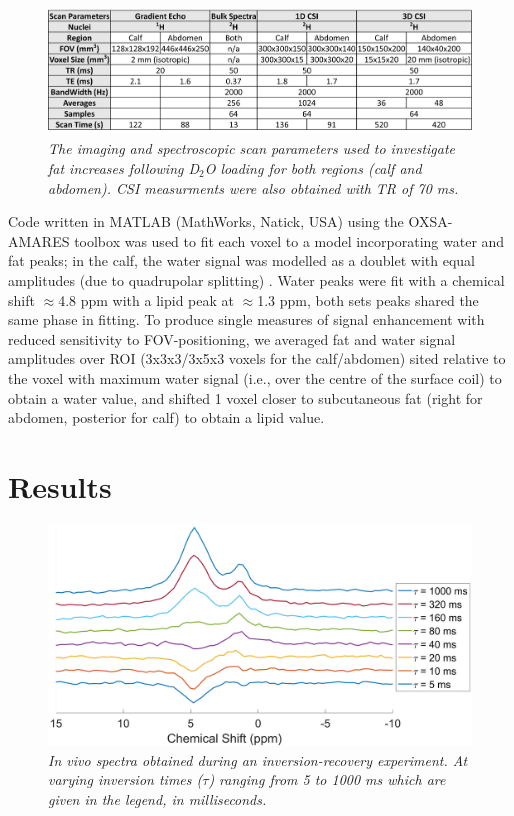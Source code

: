 \begin{figure}
    \centering
    \includegraphics[width=1\textwidth]{Figures/Lipid/Scan_Details.png}
    \caption{\textit{The imaging and spectroscopic scan parameters used to investigate fat increases following D$_2$O loading for both regions (calf and abdomen). CSI measurments were also obtained with TR of 70 ms.}}
    \label{fig:Lip:Scan_Detail}
\end{figure}

Code written in MATLAB (MathWorks, Natick, USA) using the OXSA-AMARES \cite{Purvis2017OXSA:MATLAB} toolbox was used to fit each voxel to a model incorporating water and fat peaks; in the calf, the water signal was modelled as a doublet with equal amplitudes (due to quadrupolar splitting) \cite{Gursan2022ResidualMuscle}. Water peaks were fit with a chemical shift $\approx$4.8 ppm with a lipid peak at $\approx$1.3 ppm, both sets peaks shared the same phase in fitting. To produce single measures of signal enhancement with reduced sensitivity to \ac{FOV}-positioning, we averaged fat and water signal amplitudes over \ac{ROI} (3x3x3/3x5x3 voxels for the calf/abdomen) sited relative to the voxel with maximum water signal (i.e., over the centre of the surface coil) to obtain a water value, and shifted 1 voxel closer to subcutaneous fat (right for abdomen, posterior for calf) to obtain a lipid value.

\section{Results}

\begin{figure}
    \centering
    \includegraphics[width=1\textwidth]{Figures/Lipid/NA_IR.png}
    \caption{\textit{\textit{In vivo} spectra obtained during an inversion-recovery experiment. At varying inversion times ($\tau$) ranging from 5 to 1000 ms which are given in the legend, in milliseconds.}}
    \label{fig:Lip:IR}
\end{figure}

